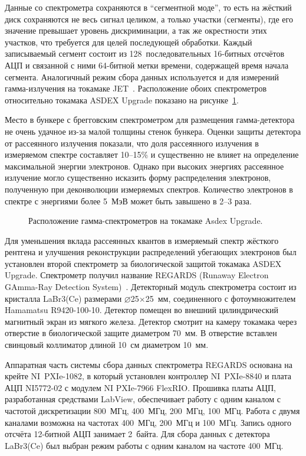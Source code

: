 Данные со спектрометра сохраняются в ``сегментной моде'', то есть на жёсткий диск сохраняются не весь сигнал целиком, а только участки (сегменты), где его значение превышает уровень дискриминации, а так же окрестности этих участков, что требуется для целей последующей обработки. Каждый записываемый сегмент состоит из 128~последовательных 16-битных отсчётов АЦП и связанной с ними 64-битной метки времени, содержащей время начала сегмента. Аналогичный режим сбора данных используется и для измерений гамма-излучения на токамаке JET~\cite{Pereira2008}. Расположение обоих спектрометров относительно токамака ASDEX Upgrade показано на рисунке~\ref{fig:asdexSpectrometersPosition}. 

Место в бункере с брегговским спектрометром для размещения гамма-детектора не очень удачное из-за малой толщины стенок бункера. Оценки защиты детектора от рассеянного излучения показали, что доля рассеянного излучения в измеряемом спектре составляет 10--15\% и существенно не влияет на определение максимальной энергии электронов. Однако при высоких энергиях рассеянное излучение могло существенно исказить форму распределения электронов, полученную при деконволюции измеряемых спектров. Количество электронов в спектре с энергиями более 5~МэВ может быть завышено в 2--3 раза.~\cite{Shevelev2021,Nocente2018}

\begin{figure}[ht!]
  \caption{ Расположение гамма-спектрометров на токамаке Asdex Upgrade.~\cite{Shevelev2021} }
  \label{fig:asdexSpectrometersPosition}
\end{figure}

Для уменьшения вклада рассеянных квантов в измеряемый спектр жёсткого рентгена и улучшения реконструкции распределений убегающих электронов был установлен второй спектрометр за биологической защитой токамака ASDEX Upgrade. Спектрометр получил название REGARDS (Runaway Electron GAmma-Ray Detection System)~\cite{DalMolin2019}. Детекторный модуль спектрометра состоит из кристалла LaBr3(Ce) размерами $\varnothing$25$\times$25~мм, соединенного с фотоумножителем Hamamatsu R9420-100-10. Детектор помещен во внешний цилиндрический магнитный экран из мягкого железа. Детектор смотрит на камеру токамака через отверстие в биологической защите диаметром 70~мм. В отверстие вставлен свинцовый коллиматор длиной 10~см диаметром 10~мм.~\cite{Shevelev2021} 

Аппаратная часть системы сбора данных спектрометра REGARDS основана на крейте NI~PXIe-1082, в который установлен контроллер NI~PXIe-8840 и плата АЦП NI5772-02 с модулем NI PXIe-7966 FlexRIO. Прошивка платы АЦП, разработанная средствами LabView, обеспечивает работу с одним каналом с частотой дискретизации 800~МГц, 400~МГц, 200~МГц, 100~МГц. Работа с двумя каналами возможна на частотах 400~МГц, 200~МГц и 100~МГц. Запись одного отсчёта 12-битной АЦП занимает 2~байта. Для сбора данных с детектора LaBr3(Ce) был выбран режим работы с одним каналом на частоте 400~МГц.~\cite{Shevelev2021}

